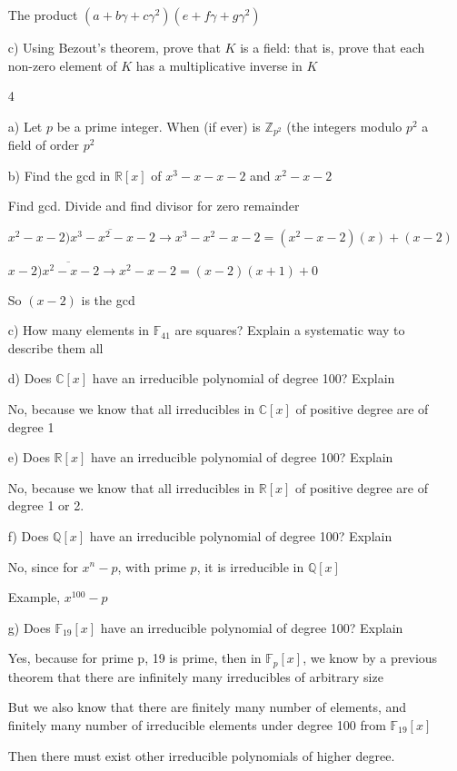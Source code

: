 \documentclass[12pt]{article}
\begin{document}
\begin{itemize}
		The product $(a + b\gamma + c\gamma^2)(e + f\gamma + g\gamma^2) $

		c) Using Bezout's theorem, prove that $K$ is a field: that is, prove that each non-zero element of $K$ has a multiplicative inverse in $K$

	\item[4]

		a) Let $p$ be a prime integer. When (if ever) is $\mathbb{Z}_{p^2}$ (the integers modulo $p^2$ a field of order $p^2$

		b) Find the gcd in $\mathbb{R}[x]$ of $x^3 - x - x - 2$ and $x^2 - x - 2$

		Find gcd. Divide and find divisor for zero remainder

		$x^2-x-2\overline{)x^3 - x^2 - x - 2} \rightarrow x^3 - x^2 - x - 2 = (x^2 - x - 2)(x) + (x-2)$

		$x-2\overline{)x^2 - x - 2} \rightarrow x^2 - x - 2 = (x-2)(x+1) + 0$

		So $(x-2)$ is the gcd

		c) How many elements in $\mathbb{F}_{41}$ are squares? Explain a systematic way to describe them all

		d) Does $\mathbb{C}[x]$ have an irreducible polynomial of degree 100? Explain

		No, because we know that all irreducibles in $\mathbb{C}[x]$ of positive degree are of degree 1 

		e) Does $\mathbb{R}[x]$ have an irreducible polynomial of degree 100? Explain

		No, because we know that all irreducibles in $\mathbb{R}[x]$ of positive degree are of degree 1 or 2.

		f) Does $\mathbb{Q}[x]$ have an irreducible polynomial of degree 100? Explain

		No, since for $x^n - p$, with prime $p$, it is irreducible in $\mathbb{Q}[x]$

		Example, $x^{100} - p$

		g) Does $\mathbb{F}_{19}[x]$ have an irreducible polynomial of degree 100? Explain

		Yes, because for prime p, 19 is prime, then in $\mathbb{F}_p[x]$, we know by a previous theorem that there are infinitely many irreducibles of arbitrary size

		But we also know that there are finitely many number of elements, and finitely many number of irreducible elements under degree 100 from $\mathbb{F}_{19}[x]$

		Then there must exist other irreducible polynomials of higher degree.


\end{itemize}
\end{document}

